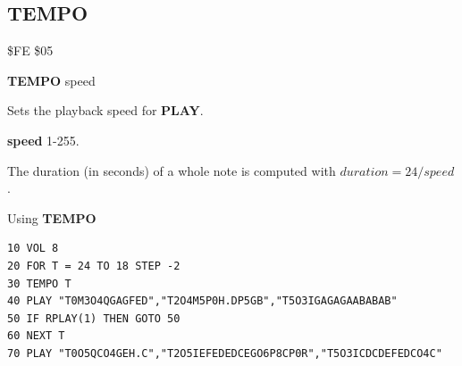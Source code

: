 
\newpage
\subsection{TEMPO}
\begin{description}[leftmargin=2cm,style=nextline]
\item [Token:] \$FE \$05
\item [Format:] {\bf TEMPO} speed
\item [Usage:] Sets the playback speed for {\bf PLAY}.

               {\bf speed} 1-255.

               The duration (in seconds) of a whole note is computed with
               $ duration = 24 / speed $.

\item [Example:] Using {\bf TEMPO}
\begin{tcolorbox}[colback=black,coltext=white]
\verbatimfont{\codefont}
\begin{verbatim}
10 VOL 8
20 FOR T = 24 TO 18 STEP -2
30 TEMPO T
40 PLAY "T0M3O4QGAGFED","T2O4M5P0H.DP5GB","T5O3IGAGAGAABABAB"
50 IF RPLAY(1) THEN GOTO 50
60 NEXT T
70 PLAY "T0O5QCO4GEH.C","T2O5IEFEDEDCEGO6P8CP0R","T5O3ICDCDEFEDCO4C"
\end{verbatim}
\end{tcolorbox}
\end{description}


\newpage
